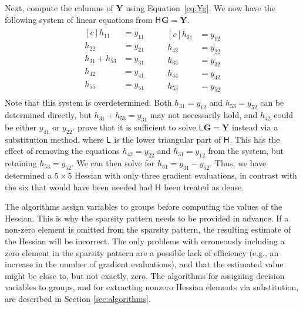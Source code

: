 \documentclass[article]{jss}\usepackage[]{graphicx}\usepackage[]{color}
\newcommand{\hess}[2]{\mathsf{H}_{#1}#2}
\newcommand{\hessLT}[2]{\mathsf{L}_{#1}#2}
\newcommand{\Mat}[1]{\mathbf{#1}}
\begin{document}
Next, compute the columns of $\Mat{Y}$ using Equation~\ref{eq:Yg}.  We now
have the following system of linear equations from $\hess{}{}\Mat{G}=\Mat{Y}$.
\begin{align}
  \label{eq:11}
  \begin{aligned}[c]
  h_{11}&=y_{11}\\
  h_{22}&=y_{21}\\
  h_{31}+h_{53}&=y_{31}\\
  h_{42}&=y_{41}\\
  h_{55}&=y_{51}\\
  \end{aligned}
  \qquad
  \begin{aligned}[c]
  h_{31}&=y_{12}\\
  h_{42}&=y_{22}\\
  h_{33}&=y_{32}\\
  h_{44}&=y_{42}\\
  h_{53}&=y_{52}
  \end{aligned}
\end{align}
Note that this system is overdetermined.  Both $h_{31}=y_{12}$ and $h_{53}=y_{52}$
can be determined directly, but $h_{31}+h_{53}=y_{31}$ may not
necessarily hold, and $h_{42}$
could be either $y_{41}$ or $y_{22}$.   prove
that it is sufficient to solve $\hessLT{}{}\Mat{G}=\Mat{Y}$ instead
via a substitution method, where $\hessLT{}{}$ is the lower
triangular part of $\hess{}{}$.  This has the effect of removing the equations
$h_{42}=y_{22}$ and $h_{31}=y_{12}$ from the system, but retaining
$h_{53}=y_{52}$.  We can then solve for
$h_{31}=y_{31}-y_{52}$. Thus, we have determined a
$5\times 5$ Hessian with only three gradient evaluations, in
contrast with the six that would have been needed had $\hess{}{}$ been treated
as dense.

The  algorithms assign variables to groups
before computing the values of the Hessian.  This is why the sparsity
pattern needs to be provided in advance.  If a non-zero element is
omitted from the sparsity pattern, the resulting estimate of the
Hessian will be incorrect.  The only problems with erroneously including a zero
element in the sparsity pattern are a possible lack of efficiency
(e.g., an increase in the number of gradient evaluations), and that
the estimated value might be close to, but not exactly, zero. The
algorithms for assigning decision variables to groups, and for
extracting nonzero Hessian elements via substitution, are described in
Section \ref{sec:algorithms}.
\end{document}
